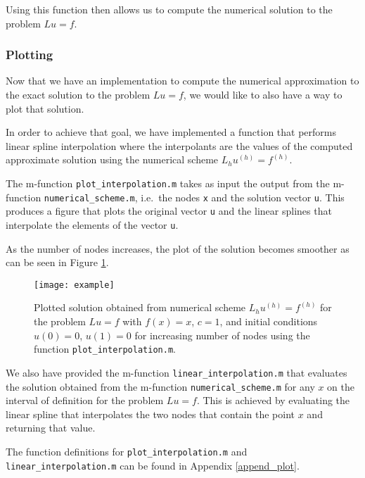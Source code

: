 Using this function then allows us to compute the numerical solution to the problem
$Lu = f$.

\subsubsection{Plotting}
Now that we have an implementation to compute the numerical approximation to the
exact solution to the problem $Lu =f$, we would like to also have a way to plot
that solution.

In order to achieve that goal, we have implemented a function that performs
linear spline interpolation where the interpolants are the values of the computed
approximate solution using the numerical scheme $L_h u^{(h)} = f^{(h)}$.

The m-function \texttt{plot\_interpolation.m} takes as input the output from the
m-function \texttt{numerical\_scheme.m}, i.e.\ the nodes \texttt{x} and the
solution vector \texttt{u}. This produces a figure that plots the original
vector \texttt{u} and the linear splines that interpolate the elements of the
vector \texttt{u}.

As the number of nodes increases, the plot of the solution becomes smoother as
can be seen in Figure \ref{example_plot}.

\begin{figure}[h!]
  \begin{center}
    \texttt{[image: example]}
  \end{center}
  \caption{Plotted solution obtained from numerical scheme $L_h u^{(h)} = f^{(h)}$ for the problem $Lu = f$ with
    $f(x) = x$, $c =1$, and initial conditions $u(0) = 0$, $u(1) = 0$ for increasing number of nodes
    using the function \texttt{plot\_interpolation.m}.}\label{example_plot}
\end{figure}

We also have provided the m-function \texttt{linear\_interpolation.m} that evaluates
the solution obtained from the m-function \texttt{numerical\_scheme.m} for any $x$
on the interval of definition for the problem $Lu = f$. This is achieved
by evaluating the linear spline that interpolates the two nodes that contain
the point $x$ and returning that value.

The function definitions for \texttt{plot\_interpolation.m} and \texttt{linear\_interpolation.m}
can be found in Appendix \ref{append_plot}.